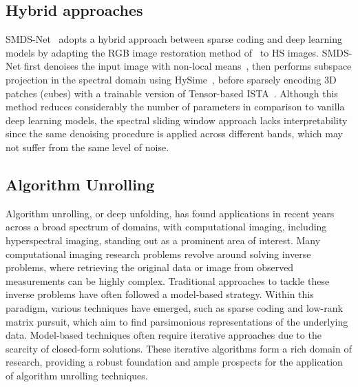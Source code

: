 \subsection{Hybrid approaches}

SMDS-Net~\cite{xiong_smds-net_2020} adopts a hybrid approach between sparse coding and deep learning models by adapting the RGB image restoration method of~\cite{lecouat_fully_2020} to HS images.
SMDS-Net first denoises the input image with non-local means~\cite{buades_non-local_2005}, then performs subspace projection in the spectral domain using HySime~\cite{bioucas-dias_hyperspectral_2008}, before sparsely encoding 3D patches (cubes) with a trainable version of Tensor-based ISTA~\cite{qi_tensr_2016}.
Although this method reduces considerably the number of parameters in comparison to vanilla deep learning models, the spectral sliding window approach lacks interpretability since the same denoising procedure is applied across different bands, which may not suffer from the same level of noise.

\subsection{Algorithm Unrolling}

Algorithm unrolling, or deep unfolding, has found applications in recent years across a broad spectrum of domains, with computational imaging, including hyperspectral imaging, standing out as a prominent area of interest.
Many computational imaging research problems revolve around solving inverse problems, where retrieving the original data or image from observed measurements can be highly complex.
Traditional approaches to tackle these inverse problems have often followed a model-based strategy.
Within this paradigm, various techniques have emerged, such as sparse coding and low-rank matrix pursuit, which aim to find parsimonious representations of the underlying data.
Model-based techniques often require iterative approaches due to the scarcity of closed-form solutions.
These iterative algorithms form a rich domain of research, providing a robust foundation and ample prospects for the application of algorithm unrolling techniques.

